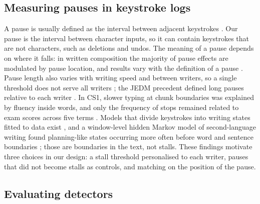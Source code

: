 \subsection{Measuring pauses in keystroke logs}

A pause is usually defined as the interval between adjacent keystrokes \cite{guo2018basic,baaijen2012keystroke}. Our
pause is the interval between character inputs, so it can contain keystrokes that are not characters, such as
deletions and undos. The meaning of a pause depends on where it falls: in written composition the majority of pause
effects are modulated by pause location, and results vary with the definition of a pause
\cite{medimorec2017pauses,immonen2006translation,fuchs2016prosodic}. Pause length also varies with writing speed and
between writers, so a single threshold does not serve all writers
\cite{chenu2014interword,litvinova2024investigating,guo2018basic,roeser2024disfluencies,hall2024constructing}; the JEDM
precedent defined long pauses relative to each writer \cite{guo2020scenario}. In CS1, slower typing at chunk
boundaries was explained by fluency inside words, and only the frequency of stops remained related to exam scores
across five terms \cite{koutcheme2026keystroke,shrestha2022pausing,edwards2020programming}. Models that divide keystrokes
into writing states fitted to data exist \cite{guo2020scenario,guo2018basic}, and a window-level hidden Markov model of
second-language writing found planning-like states occurring more often before word and sentence boundaries
\cite{garcesmanzanera2026modeling}; those are boundaries in the text, not stalls. These findings motivate three choices
in our design: a stall threshold personalised to each writer, pauses that did not become stalls as controls, and
matching on the position of the pause.

\subsection{Evaluating detectors}

